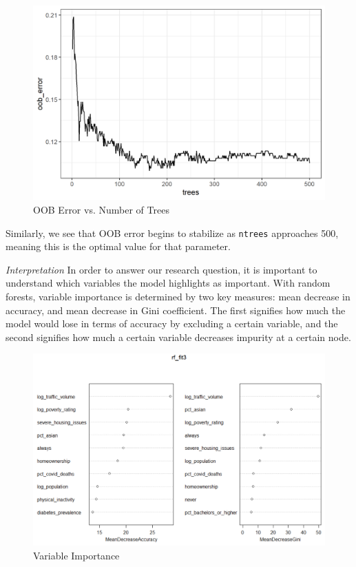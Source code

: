 \documentclass[
]{article}
\begin{document}
\begin{figure}

{\centering \includegraphics[width=0.8\linewidth]{../results/def_OOB_plot} 

}

\caption{OOB Error vs. Number of Trees}\label{fig:def-OOB-err-plot}
\end{figure}

Similarly, we see that OOB error begins to stabilize as \texttt{ntrees} approaches 500, meaning this is the optimal value for that parameter.

\emph{Interpretation}
In order to answer our research question, it is important to understand which variables the model highlights as important. With random forests, variable importance is determined by two key measures: mean decrease in accuracy, and mean decrease in Gini coefficient. The first signifies how much the model would lose in terms of accuracy by excluding a certain variable, and the second signifies how much a certain variable decreases impurity at a certain node.

\begin{figure}

{\centering \includegraphics[width=0.8\linewidth]{../results/rf-varimp} 

}

\caption{Variable Importance}\label{fig:rf-varimp}
\end{figure}
\end{document}

